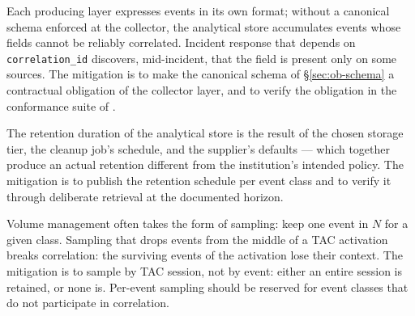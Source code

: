 \begin{pitfallbox}
\noindent Each producing layer expresses events in its own format;
without a canonical schema enforced at the collector, the
analytical store accumulates events whose fields cannot be
reliably correlated. Incident response that depends on
\texttt{correlation\_id} discovers, mid-incident, that the field
is present only on some sources. The mitigation is to make the
canonical schema of \S\ref{sec:ob-schema} a contractual obligation
of the collector layer, and to verify the obligation in the
conformance suite of .
\end{pitfallbox}

\begin{pitfallbox}
\noindent The retention duration of the analytical store is the
result of the chosen storage tier, the cleanup job's schedule, and
the supplier's defaults --- which together produce an actual
retention different from the institution's intended policy. The
mitigation is to publish the retention schedule per event class
and to verify it through deliberate retrieval at the documented
horizon.
\end{pitfallbox}

\begin{pitfallbox}
\noindent Volume management often takes the form of sampling: keep
one event in $N$ for a given class. Sampling that drops events from
the middle of a TAC activation breaks correlation: the surviving
events of the activation lose their context. The mitigation is to
sample by TAC session, not by event: either an entire session is
retained, or none is. Per-event sampling should be reserved for
event classes that do not participate in correlation.
\end{pitfallbox}
